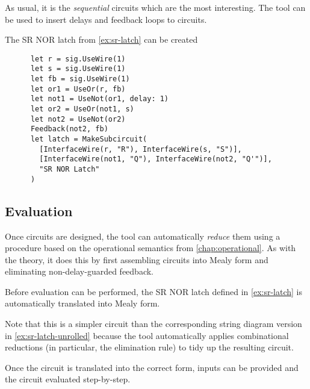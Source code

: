 As usual, it is the \emph{sequential} circuits which are the most interesting.
The tool can be used to insert delays and feedback loops to circuits.

\begin{example}\label{ex:sr-latch-hdl}
  The SR NOR latch from \cref{ex:sr-latch} can be created
  \begin{lstlisting}
      let r = sig.UseWire(1)
      let s = sig.UseWire(1)
      let fb = sig.UseWire(1)
      let or1 = UseOr(r, fb)
      let not1 = UseNot(or1, delay: 1)
      let or2 = UseOr(not1, s)
      let not2 = UseNot(or2)
      Feedback(not2, fb)
      let latch = MakeSubcircuit(
        [InterfaceWire(r, "R"), InterfaceWire(s, "S")],
        [InterfaceWire(not1, "Q"), InterfaceWire(not2, "Q'")],
        "SR NOR Latch"
      )
    \end{lstlisting}
  \begin{center}
    \scalebox{0.3}{}
  \end{center}
\end{example}

\subsection{Evaluation}

Once circuits are designed, the tool can automatically \emph{reduce} them
using a procedure based on the operational semantics from
\cref{chap:operational}.
As with the theory, it does this by first assembling circuits into Mealy form
and eliminating non-delay-guarded feedback.

\begin{example}\label{ex:sr-latch-evaluator}
  Before evaluation can be performed, the SR NOR latch defined in
  \cref{ex:sr-latch} is automatically translated into Mealy form.
  \begin{center}
    \scalebox{0.25}{}
  \end{center}
  Note that this is a simpler circuit than the corresponding string diagram
  version in \cref{ex:sr-latch-unrolled} because the tool automatically
  applies combinational reductions (in particular, the elimination rule) to
  tidy up the resulting circuit.
\end{example}

Once the circuit is translated into the correct form, inputs can be provided
and the circuit evaluated step-by-step.

